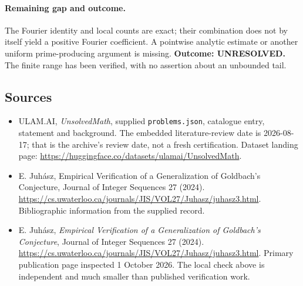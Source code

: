 \documentclass[11pt,a4paper]{article}
\begin{document}
\paragraph{Remaining gap and outcome.}
The Fourier identity and local counts are exact; their combination
does not by itself yield a positive Fourier coefficient. A pointwise
analytic estimate or another uniform prime-producing argument is
missing. \textbf{Outcome: UNRESOLVED.} The finite range has been
verified, with no assertion about an unbounded tail.

\subsection{Sources}

{\small

\begin{itemize}

\item[\hypertarget{source:statement:1}{S1}] ULAM.AI, \emph{UnsolvedMath}, supplied \texttt{problems.json}, catalogue entry, statement and background. The embedded literature-review date is 2026-08-17; that is the archive’s review date, not a fresh certification. Dataset landing page: \url{https://huggingface.co/datasets/ulamai/UnsolvedMath}.

\item[\hypertarget{source:statement:2}{S2}] E. Juhász, Empirical Verification of a Generalization of Goldbach's Conjecture, Journal of Integer Sequences 27 (2024). \url{https://cs.uwaterloo.ca/journals/JIS/VOL27/Juhasz/juhasz3.html}. Bibliographic information from the supplied record.


\item[E1] E. Juh\'asz, \emph{Empirical Verification of a Generalization
of Goldbach's Conjecture}, Journal of Integer Sequences 27 (2024).
\url{https://cs.uwaterloo.ca/journals/JIS/VOL27/Juhasz/juhasz3.html}.
Primary publication page inspected 1 October 2026. The local check above
is independent and much smaller than published verification work.

\end{itemize}

}

\label{end:statement}
\end{document}
